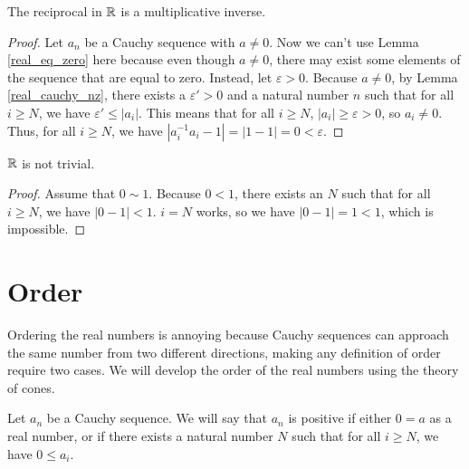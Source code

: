 \documentclass[../../math.tex]{subfiles}
\begin{document}
\begin{instance}
    The reciprocal in $\mathbb{R}$ is a multiplicative inverse.
\end{instance}
\begin{proof}
    Let $a_n$ be a Cauchy sequence with $a \neq 0$.  Now we can't use Lemma
    \ref{real_eq_zero} here because even though $a \neq 0$, there may exist some
    elements of the sequence that are equal to zero.  Instead, let $\varepsilon
    > 0$.  Because $a \neq 0$, by Lemma \ref{real_cauchy_nz}, there exists a
    $\varepsilon' > 0$ and a natural number $n$ such that for all $i \geq N$, we
    have $\varepsilon' \leq |a_i|$.  This means that for all $i \geq N$, $|a_i|
    \geq \varepsilon > 0$, so $a_i \neq 0$.  Thus, for all $i \geq N$, we have
    $|a_i^{-1} a_i - 1| = |1 - 1| = 0 < \varepsilon$.
\end{proof}

\begin{instance}
    $\mathbb{R}$ is not trivial.
\end{instance}
\begin{proof}
    Assume that $0 \sim 1$.  Because $0 < 1$, there exists an $N$ such that for
    all $i \geq N$, we have $|0 - 1| < 1$.  $i = N$ works, so we have $|0 - 1| =
    1 < 1$, which is impossible.
\end{proof}

\section{Order}

Ordering the real numbers is annoying because Cauchy sequences can approach the
same number from two different directions, making any definition of order
require two cases.  We will develop the order of the real numbers using the
theory of cones.

\begin{definition}
    Let $a_n$ be a Cauchy sequence.  We will say that $a_n$ is positive if
    either $0 = a$ as a real number, or if there exists a natural number $N$
    such that for all $i \geq N$, we have $0 \leq a_i$.
\end{definition}
\end{document}
